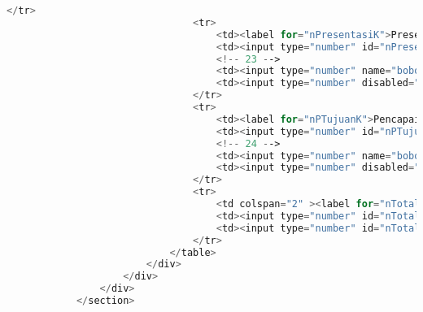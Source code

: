 \begin{lstlisting}[language=PHP,basicstyle=\tiny,caption=skripsi.php]
								</tr>
								<tr>
									<td><label for="nPresentasiK">Presentasi</label></td>
									<td><input type="number" id="nPresentasiK" max="100" ng-model="nilai_PresentasiK" class="form-nilai"/></td>
									<!-- 23 -->
									<td><input type="number" name="bobotPresentasiKetua" ng-model="presentasiK.value" ng-init="presentasiK.value = 15" min="0" max="100" class="form-nilai" readonly="readonly" /></td>
									<td><input type="number" disabled="disabled" value="{{nilai_PresentasiK * presentasiK.value / 100}}" ng-model="total_PresentasiK" class="form-nilai"/></td>
								</tr>
								<tr>
									<td><label for="nPTujuanK">Pencapaian Tujuan</label></td>
									<td><input type="number" id="nPTujuanK" max="100" ng-model="nilai_PTujuanK" class="form-nilai"/></td>
									<!-- 24 -->
									<td><input type="number" name="bobotPencapaianTujuanKetua" ng-model="PTujuanK.value" ng-init="PTujuanK.value = 30" min="0" max="100" class="form-nilai" readonly="readonly" /></td>
									<td><input type="number" disabled="disabled" value="{{nilai_PTujuanK * PTujuanK.value / 100}}" ng-model="total_PTujuanK" class="form-nilai"/></td>
								</tr>
								<tr>
									<td colspan="2" ><label for="nTotalBobotK">Total</label></td>
									<td><input type="number" id="nTotalBobotK" max="100" disabled="disabled" value={{TTLaporanK.value+KMateriK.value+PMateriK.value+presentasiK.value+PTujuanK.value}} class="form-nilai"/></td>
									<td><input type="number" id="nTotalKetua" ng-model="nTotalKetua" max="100" value= "{{nilai_TTLaporanK * TTLaporanK.value / 100 + nilai_KMateriK * KMateriK.value / 100 + nilai_PMateriK * PMateriK.value / 100 + nilai_PresentasiK * presentasiK.value / 100 + nilai_PTujuanK * PTujuanK.value / 100}}" class="form-nilai" disabled="disabled" /></td>
								</tr>
							</table>
						</div>
					</div>
				</div>
			</section>
			

\end{lstlisting}
